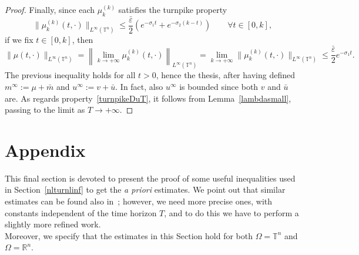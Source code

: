 \documentclass[10pt,a4paper,nouppercase,nowrite]{article}
\numberwithin{equation}{section}
\newcommand{\eps}{\varepsilon}
\newcommand{\R}{\mathbb{R}}
\newcommand{\T}{\mathbb{T}}
\theoremstyle{definition}
\begin{document}
\begin{proof}
	Finally, since each $\mu_k^{(k)}$ satisfies the turnpike property
	\begin{equation*}
		\| \mu_k^{(k)}(t,\cdot) \|_{L^{\infty}(\T^n)} \le \frac{\bar \eps}{2} \left( e^{-\sigma_1 t} + e^{-\sigma_2(k-t)} \right) \qquad \forall t \in [0,k],
	\end{equation*}
	if we fix $t \in [0,k]$, then
	$$\| \mu(t,\cdot) \|_{L^{\infty}(\T^n)} = \left \| \lim_{k \to +\infty} \mu_k^{(k)}(t,\cdot) \right \|_{L^{\infty}(\T^n)} = \lim_{k \to +\infty} \| \mu_k^{(k)}(t,\cdot) \|_{L^{\infty}(\T^n)} \le \frac{\bar \eps}{2} e^{-\sigma_1 t}.$$
	The previous inequality holds for all $t > 0$, hence the thesis, after having defined $m^{\infty}:=\mu + \bar m$ and $u^{\infty}:=v+\bar u$. In fact, also $u^{\infty}$ is bounded since both $v$ and $\bar u$ are.  As regards property~\eqref{turnpikeDuT}, it follows from Lemma~\ref{lambdasmall}, passing to the limit as $T \to +\infty$.
\end{proof}

\section{Appendix} \label{appendix}
	This final section is devoted to present the proof of some useful inequalities used in Section~\ref{nlturnlinf} to get the \textit{a priori} estimates. We point out that similar estimates can be found also in~\cite{CG22}; however, we need more precise ones, with constants independent of the time horizon $T$, and to do this we have to perform a slightly more refined work. \\
	Moreover, we specify that the estimates in this Section hold for both $\Omega = \T^n$ and $\Omega = \R^n$.
	
\end{document}
